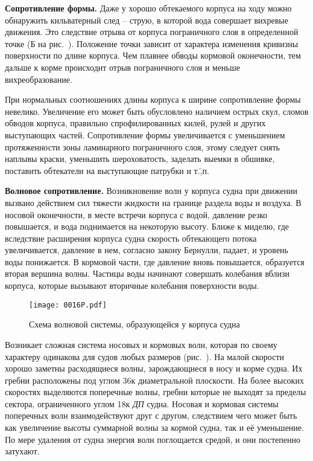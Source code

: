 \textbf{Сопротивление формы.} Даже у хорошо обтекаемого корпуса на ходу можно обнаружить кильватерный след \--- струю, в которой вода совершает вихревые движения. Это следствие отрыва от корпуса пограничного слоя в определенной точке (Б на рис.~). Положение точки зависит от характера изменения кривизны поверхности по длине корпуса. Чем плавнее обводы кормовой оконечности, тем дальше к корме происходит отрыв пограничного слоя и меньше вихреобразование. 

При нормальных соотношениях длины корпуса к ширине сопротивление формы невелико. Увеличение его может быть обусловлено наличием острых скул, сломов обводов корпуса, правильно спрофилированных килей, рулей и других выступающих частей. Сопротивление формы увеличивается с уменьшением протяженности зоны ламинарного пограничного слоя, этому следует снять наплывы краски, уменьшить шероховатость, заделать выемки в обшивке, поставить обтекатели на выступающие патрубки и т.\=,п.

\textbf{Волновое сопротивление.} Возникновение волн у корпуса судна при движении вызвано действием сил тяжести жидкости на границе раздела воды и воздуха. В носовой оконечности, в месте встречи корпуса с водой, давление резко повышается, и вода поднимается на некоторую высоту. Ближе к миделю, где вследствие расширения корпуса судна скорость обтекающего потока увеличивается, давление в нем, согласно закону Бернулли, падает, и уровень воды понижается. В кормовой части, где давление вновь повышается, образуется вторая вершина волны. Частицы воды начинают совершать колебания вблизи корпуса, которые вызывают вторичные колебания поверхности воды.

\begin{figure*}[htb]
  \centering
  \texttt{[image: 0016P.pdf]}
  \caption{Схема волновой системы, образующейся у корпуса судна}
  \label{fig:16}
\end{figure*}

Возникает сложная система носовых и кормовых волн, которая по своему характеру одинакова для судов любых размеров (рис.~). На малой скорости хорошо заметны расходящиеся волны, зарождающиеся в носу и корме судна. Их гребни расположены под углом 36\gr к диаметральной плоскости. На более высоких скоростях выделяются поперечные волны, гребни которые не выходят за пределы сектора, ограниченного углом 18\gr к \textit{ДП} судна. Носовая и кормовая системы поперечных волн взаимодействуют друг с другом, следствием чего может быть как увеличение высоты суммарной волны за кормой судна, так и её уменьшение. По мере удаления от судна энергия волн поглощается средой, и они постепенно затухают.

